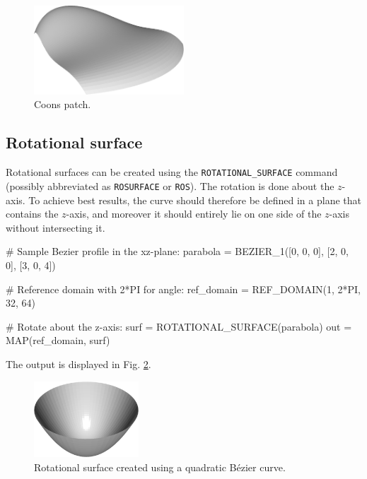 \begin{figure}[!ht]
\begin{center}
\includegraphics[width=0.5\textwidth]{img/curves-3.png}
\end{center}
\vspace{-4mm}
\caption{Coons patch.}
\label{fig:curves-3}
\end{figure}

\subsection{Rotational surface}

Rotational surfaces can be created using the {\tt ROTATIONAL\_SURFACE} command
(possibly abbreviated as {\tt ROSURFACE} or {\tt ROS}).
The rotation is done about the $z$-axis. To achieve best results, the curve
should therefore be defined in a plane that contains the $z$-axis, and moreover 
it should entirely lie on one side of the $z$-axis without intersecting it.

\begin{bluecode}
# Sample Bezier profile in the xz-plane: 
parabola = BEZIER_1([0, 0, 0], [2, 0, 0], [3, 0, 4])
  
# Reference domain with 2*PI for angle:
ref_domain = REF_DOMAIN(1, 2*PI, 32, 64)

# Rotate about the z-axis:
surf = ROTATIONAL_SURFACE(parabola)
out = MAP(ref_domain, surf)
\end{bluecode}
The output is displayed in Fig. \ref{fig:curves-4}.\\

\begin{figure}[!ht]
\begin{center}
\includegraphics[width=0.35\textwidth]{img/curves-4.png}
\end{center}
\vspace{-4mm}
\caption{Rotational surface created using a quadratic B\'ezier curve.}
\label{fig:curves-4}
\end{figure}

